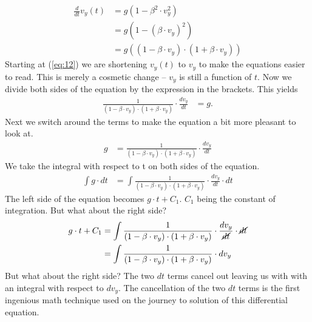 \documentclass[paper=a4, fontsize=11pt]{scrartcl} %
\numberwithin{equation}{section} %
\numberwithin{figure}{section} %
\numberwithin{table}{section} %
\begin{document}
\begin{align} \label{eq:12}
\frac{d}{dt} v_y(t) &= g \left(1 - \beta^2 \cdot v_y^2\right) \\
                    &= g \left(1 - (\beta \cdot v_y)^2\right) \\
                    &= g \left((1 - \beta \cdot v_y)\cdot (1 + \beta \cdot v_y)\right)
\end{align}
Starting at (\ref{eq:12}) we are shortening $v_y(t)$ to $v_y$ to make the equations easier to read. This is merely a cosmetic change
 -- $v_y$ is still a function of $t$. Now we divide both sides of the equation by the expression in the brackets. This yields
\begin{align} \label{eq:13}
\frac{1}{(1 - \beta \cdot v_y)\cdot (1 + \beta \cdot v_y)} \cdot \frac{d v_y}{dt}  &= g.
\end{align}
Next we switch around the terms to make the equation a bit more pleasant to look at.
\begin{align} \label{eq:14}
g  &= \frac{1}{(1 - \beta \cdot v_y)\cdot (1 + \beta \cdot v_y)} \cdot \frac{d v_y}{dt}
\end{align}
We take the integral with respect to t on both sides of the equation.
\begin{align} \label{eq:15}
\int g \cdot dt &= \int \frac{1}{(1 - \beta \cdot v_y)\cdot (1 + \beta \cdot v_y)} \cdot \frac{d v_y}{dt} \cdot dt
\end{align}
The left side of the equation becomes $g \cdot t + C_1$. $C_1$ being the constant of integration.
But what about the right side?
\begin{align} 
g \cdot t + C_1 &= \int \frac{1}{(1 - \beta \cdot v_y)\cdot (1 + \beta \cdot v_y)} \cdot \frac{d v_y}{\cancel{dt}} \cdot \cancel{dt} \label{eq:16}\\
                &= \int \frac{1}{(1 - \beta \cdot v_y)\cdot (1 + \beta \cdot v_y)} \cdot d v_y \label{eq:17}
\end{align}
But what about the right side? The two $dt$ terms cancel out leaving us with with an integral with respect to $dv_y$.
The cancellation of the two $dt$ terms is the first ingenious math technique used on the journey to solution of this differential equation.
\vspace{\baselineskip}
\end{document}
